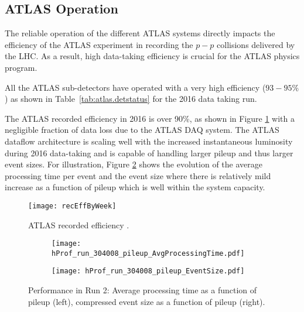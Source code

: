 \subsection{ATLAS Operation}

The reliable operation of the different ATLAS systems directly impacts the 
efficiency of the ATLAS experiment 
in recording the $p-p$ collisions delivered by the LHC. 
As a result, high data-taking efficiency is crucial 
for the ATLAS physics program. 

All the ATLAS sub-detectors have operated with a very high efficiency 
($93-95\%$) as shown in Table~\ref{tab:atlas.detstatus} for the 2016 
data taking run.

The ATLAS recorded efficiency in 2016 is over 90\%, as shown in 
Figure \ref{fig:tdaq_diagram} with a negligible fraction of data loss due to 
the ATLAS DAQ system. 
The ATLAS dataflow architecture is scaling well with the increased 
instantaneous luminosity during 2016 data-taking and is capable of handling 
larger pileup and thus larger event sizes.
For illustration,  Figure \ref{fig:run_pileup} shows the evolution of the 
average processing time per event and 
the event size where there is relatively mild increase as a function of pileup 
which is well within the system capacity.

\begin{figure}[t!]
\vspace{-0.5cm}
\centering
\texttt{[image: recEffByWeek]} 
\vspace{-2.5cm}
\caption{ATLAS recorded efficiency \cite{atlasTwiki}.}
\label{fig:tdaq_diagram}
\end{figure} 


\begin{figure}[t!]
\centering
\begin{subfigure}[t]{0.48\textwidth}
\texttt{[image: hProf\_run\_304008\_pileup\_AvgProcessingTime.pdf]}
\end{subfigure}
\begin{subfigure}[t]{0.48\textwidth}
\texttt{[image: hProf\_run\_304008\_pileup\_EventSize.pdf]}
\end{subfigure}
\vspace{-0.3cm}
\caption{Performance in Run 2: Average processing time as a function of pileup (left), compressed event size as a function of pileup (right).}
\label{fig:run_pileup}
\end{figure} 




